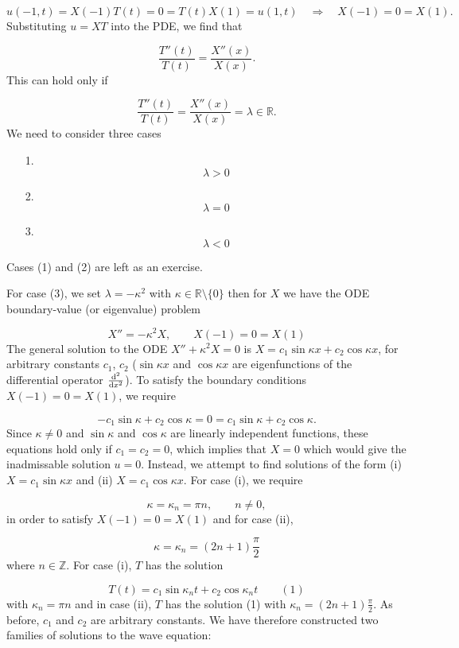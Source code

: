 \documentclass[12pt,a4paper]{article}
\begin{document}
\[
u(-1,t) = X(-1)T(t) = 0 = T(t)X(1) = u(1,t) \quad \Rightarrow \quad X(-1) = 0 = X(1).
\]
Substituting $u = XT$  into the PDE, we find that

\[
\frac{T''(t)}{T(t)} = \frac{X''(x)}{X(x)}. 
\]
This can hold only if 

\[
\frac{T''(t)}{T(t)} = \frac{X''(x)}{X(x)} = \lambda \in \mathbb{R}.
\]
We need to consider three cases

\begin{itemize}
\item[1. ] \[
\lambda > 0
\]

\item[2. ] \[
\lambda = 0
\]

\item[3. ] \[
\lambda < 0
\]
\end{itemize}
Cases (1) and (2) are left as an exercise. 

For case (3), we set $\lambda = - \kappa^2$ with $\kappa \in \mathbb{R}\setminus \{0\}$ then for $X$ we have the ODE boundary-value (or eigenvalue) problem

\[
X'' = -\kappa^2 X, \qquad X(-1) = 0 = X(1)
\]
The general solution to the ODE $X''+\kappa^2 X = 0$ is $X = c_1 \sin\kappa x + c_2\cos\kappa x$, for arbitrary constants $c_1$, $c_2$ ($\sin\kappa x$ and $\cos\kappa x$ are eigenfunctions of the differential operator $\frac{{\rm d}^2}{{\rm d}x^2}$). To satisfy the boundary conditions $X(-1) = 0 = X(1)$, we require

\[
-c_1 \sin\kappa + c_2\cos\kappa = 0 = c_1 \sin\kappa  + c_2\cos\kappa .
\]
Since $\kappa \neq 0$ and $\sin \kappa$ and $\cos \kappa$ are linearly independent functions, these equations hold only if $c_1 = c_2 = 0$, which implies that $X=0$ which would give the inadmissable solution $u = 0$.  Instead, we attempt to find solutions of the form (i) $X = c_1 \sin\kappa x$  and (ii) $X = c_1 \cos\kappa x$.  For case (i), we require

\[
    \kappa = \kappa_n = \pi n, \qquad n \neq 0,
\]
in order to satisfy $X(-1) = 0 = X(1)$ and for case (ii),

\[
\kappa = \kappa_n = (2n + 1)\frac{\pi}{2}
\]
where $n \in \mathbb{Z}$.  For case (i), $T$ has the solution

\[
T(t) = c_1 \sin\kappa_n t + c_2\cos\kappa_n t   \qquad (1)
\]
with $\kappa_n = \pi n$ and in case (ii), $T$ has the solution (1) with $\kappa_n = (2n + 1)\frac{\pi}{2}$.  As before, $c_1$ and $c_2$ are arbitrary constants.  We have therefore constructed two families of solutions to the wave equation:
\end{document}
